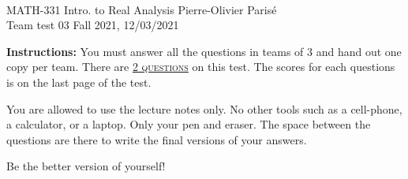 \documentclass[addpoints, 12pt]{exam}%
\theoremstyle{definition}
\begin{document}
	\noindent \hrulefill \\
	MATH-331 Intro. to Real Analysis \hfill Pierre-Olivier Paris{\'e}\\
	Team test 03 \hfill Fall 2021, 12/03/2021\\\vspace*{-0.7cm}
	
	\noindent\hrulefill
	
\vspace*{1cm}

\noindent{}
\noindent\makebox[\textwidth]{\hrulefill}

\vspace*{1cm}

\vspace*{1cm}

{\bf Instructions:} You must answer all the questions in teams of $3$ and hand out one copy per team. There are \underline{\textsc{2 questions}} on this test. The scores for each questions is on the last page of the test.

You are allowed to use the lecture notes only. No other tools such as a cell-phone, a calculator, or a laptop. Only your pen and eraser. The space between the questions are there to write the final versions of your answers.

\vspace*{5cm}

Be the better version of yourself!


\newpage
\end{document}
